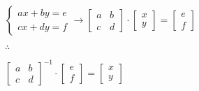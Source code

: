 \documentclass{report}
\begin{document}
\begin{center}
    $
        \begin{cases}
            ax+by=e \\
            cx+dy=f
        \end{cases}
        \rightarrow
        \begin{bmatrix}
            a & b \\
            c & d
        \end{bmatrix}
        \cdot
        \begin{bmatrix}
            x \\
            y
        \end{bmatrix}
        =
        \begin{bmatrix}
            e \\
            f
        \end{bmatrix}
    $

    $\therefore$

    $
        \begin{bmatrix}
            a & b \\
            c & d
        \end{bmatrix}^{-1}
        \cdot
        \begin{bmatrix}
            e \\
            f
        \end{bmatrix}
        =
        \begin{bmatrix}
            x \\
            y
        \end{bmatrix}
    $
\end{center}
\end{document}
